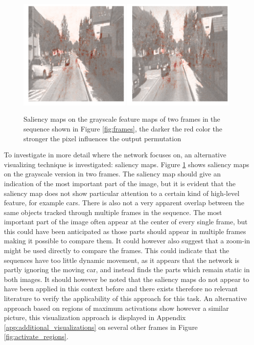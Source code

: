 \begin{figure}[t]
\centering
\includegraphics[width=0.49\textwidth]{images/saliency_1-0.png}
\includegraphics[width=0.49\textwidth]{images/saliency_1-1.png}
\caption{Saliency maps on the grayscale feature maps of two frames in the sequence shown in Figure \ref{fig:frames}, the darker the red color the stronger the pixel influences the output permutation}
\label{fig:saliency}
\end{figure}

To investigate in more detail where the network focuses on, an alternative visualizing technique is investigated: saliency maps. Figure \ref{fig:saliency} shows saliency maps on the grayscale version in two frames. The saliency map should give an indication of the most important part of the image, but it is evident that the saliency map does not show particular attention to a certain kind of high-level feature, for example cars. There is also not a very apparent overlap between the same objects tracked through multiple frames in the sequence. The most important part of the image often appear at the center of every single frame, but this could have been anticipated as those parts should appear in multiple frames making it possible to compare them. It could however also suggest that a zoom-in might be used directly to compare the frames. This could indicate that the sequences have too little dynamic movement, as it appears that the network is partly ignoring the moving car, and instead finds the parts which remain static in both images. It should however be noted that the saliency maps do not appear to have been applied in this context before and there exists therefore no relevant literature to verify the applicability of this approach for this task. An alternative approach based on regions of maximum activations show however a similar picture, this visualization approach is displayed in Appendix \ref{app:additional_visualizations} on several other frames in Figure \ref{fig:activate_regions}.

